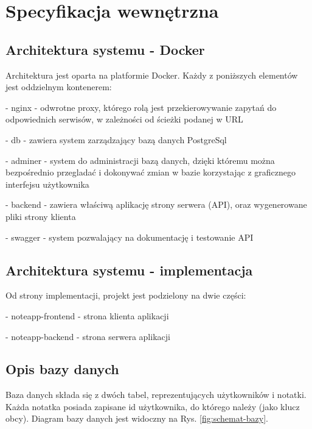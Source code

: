 \documentclass[a4paper,twoside,12pt]{book}
\begin{document}
\chapter{Specyfikacja wewnętrzna}
\label{ch:05}

\section{Architektura systemu - Docker}

Architektura jest oparta na platformie Docker.
Każdy z poniższych elementów jest oddzielnym kontenerem:

- nginx - odwrotne proxy, którego rolą jest przekierowywanie zapytań do odpowiednich serwisów, w zależności od ścieżki podanej w URL

- db - zawiera system zarządzający bazą danych PostgreSql

- adminer - system do administracji bazą danych, dzięki któremu można bezpośrednio przegladać i dokonywać zmian w bazie korzystając z graficznego interfejsu użytkownika

- backend - zawiera właściwą aplikację strony serwera (API), oraz wygenerowane pliki strony klienta 

- swagger - system pozwalający na dokumentację i testowanie API

\section{Architektura systemu - implementacja}

Od strony implementacji, projekt jest podzielony na dwie części:

- noteapp-frontend - strona klienta aplikacji

- noteapp-backend - strona serwera aplikacji


\section{Opis bazy danych}

Baza danych składa się z dwóch tabel, reprezentujących użytkowników i notatki.
Każda notatka posiada zapisane id użytkownika, do którego należy (jako klucz obcy).
Diagram bazy danych jest widoczny na Rys. \ref {fig:schemat-bazy}.
\end{document}
